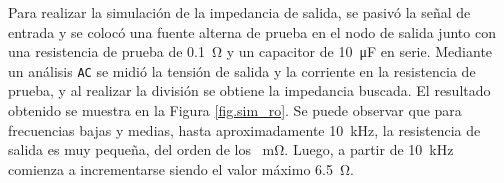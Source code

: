 
Para realizar la simulación de la impedancia de salida, se pasivó la señal de entrada y se colocó una fuente alterna de prueba en el nodo de salida junto con una resistencia de prueba de \SI{0.1}{\ohm} y un capacitor de \SI{10}{\micro\farad} en serie. Mediante un análisis \texttt{AC} se midió la tensión de salida y la corriente en la resistencia de prueba, y al realizar la división se obtiene la impedancia buscada. El resultado obtenido se muestra en la Figura \ref{fig.sim_ro}. Se puede observar que para frecuencias bajas y medias, hasta aproximadamente \SI{10}{\kilo\hertz}, la resistencia de salida es muy pequeña, del orden de los \SI{}{\milli\ohm}. Luego, a partir de \SI{10}{\kilo\hertz} comienza a incrementarse siendo el valor máximo \SI{6.5}{\ohm}.

